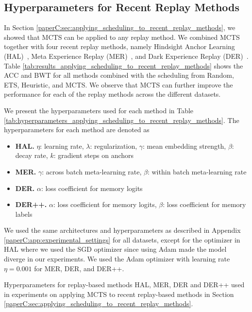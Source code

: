\subsection{Hyperparameters for Recent Replay Methods}
\label{paperC:app:apply_scheduling_to_recent_replay_methods}

In Section \ref{paperC:sec:applying_scheduling_to_recent_replay_methods}, we showed that MCTS can be applied to any replay method. We combined MCTS together with four recent replay methods, namely Hindsight Anchor Learning (HAL)~, Meta Experience Replay (MER)~, and Dark Experience Replay (DER)~. Table \ref{tab:results_applying_scheduling_to_recent_replay_methods} shows the ACC and BWT for all methods combined with the scheduling from Random, ETS, Heuristic, and MCTS. We observe that MCTS can further improve the performance for each of the replay methods across the different datasets.  

We present the hyperparameters used for each method in Table \ref{tab:hyperparameters_applying_scheduling_to_recent_replay_methods}. The hyperparameters for each method are denoted as
\begin{itemize}[topsep=0pt, noitemsep]
	\item {\bf HAL.} $\eta$: learning rate, $\lambda$: regularization, $\gamma$: mean embedding strength, $\beta$: decay rate, $k$: gradient steps on anchors   
	\item {\bf MER.} $\gamma$: across batch meta-learning rate, $\beta$: within batch meta-learning rate 
	\item {\bf DER.} $\alpha$: loss coefficient for memory logits 
	\item {\bf DER++.} $\alpha$: loss coefficient for memory logits, $\beta$: loss coefficient for memory labels
\end{itemize}
We %
used the same architectures and hyperparameters as described in Appendix \ref{paperC:app:experimental_settings} for all datasets, except for the optimizer in HAL where we used the SGD optimizer since using Adam made the model diverge in our experiments. We used the Adam optimizer with learning rate $\eta=0.001$ for MER, DER, and DER++. 


\begin{table}[t]
	\centering
	\caption{
		Hyperparameters for replay-based methods HAL, MER, DER and DER++ used in experiments on applying MCTS to recent replay-based methods in Section \ref{paperC:sec:applying_scheduling_to_recent_replay_methods}.
	}
	\vspace{-3mm}
	\resizebox{0.95\textwidth}{!}{
		
	}
	\vspace{-2mm}
	\label{tab:hyperparameters_applying_scheduling_to_recent_replay_methods}
\end{table}




